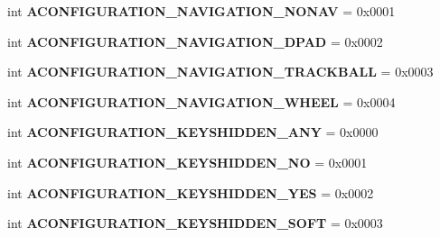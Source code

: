 \begin{DoxyCompactItemize}
\item 
\mbox{\label{classconfiguration_1_1AConfiguration_a73d9679d5df5e3169097d8616b2343c6}} 
int {\bfseries A\+C\+O\+N\+F\+I\+G\+U\+R\+A\+T\+I\+O\+N\+\_\+\+N\+A\+V\+I\+G\+A\+T\+I\+O\+N\+\_\+\+N\+O\+N\+AV} = 0x0001
\item 
\mbox{\label{classconfiguration_1_1AConfiguration_a982dee7deaf41fb4dc58f1a54fe3224e}} 
int {\bfseries A\+C\+O\+N\+F\+I\+G\+U\+R\+A\+T\+I\+O\+N\+\_\+\+N\+A\+V\+I\+G\+A\+T\+I\+O\+N\+\_\+\+D\+P\+AD} = 0x0002
\item 
\mbox{\label{classconfiguration_1_1AConfiguration_afce7273a0a26c3bebc7b920baa5c889e}} 
int {\bfseries A\+C\+O\+N\+F\+I\+G\+U\+R\+A\+T\+I\+O\+N\+\_\+\+N\+A\+V\+I\+G\+A\+T\+I\+O\+N\+\_\+\+T\+R\+A\+C\+K\+B\+A\+LL} = 0x0003
\item 
\mbox{\label{classconfiguration_1_1AConfiguration_accce645d66937e7851cf0ec89611b209}} 
int {\bfseries A\+C\+O\+N\+F\+I\+G\+U\+R\+A\+T\+I\+O\+N\+\_\+\+N\+A\+V\+I\+G\+A\+T\+I\+O\+N\+\_\+\+W\+H\+E\+EL} = 0x0004
\item 
\mbox{\label{classconfiguration_1_1AConfiguration_a4f7ef405b354dc2325f770854cccead4}} 
int {\bfseries A\+C\+O\+N\+F\+I\+G\+U\+R\+A\+T\+I\+O\+N\+\_\+\+K\+E\+Y\+S\+H\+I\+D\+D\+E\+N\+\_\+\+A\+NY} = 0x0000
\item 
\mbox{\label{classconfiguration_1_1AConfiguration_ae556a4e994f53ba58f8805315b8003a6}} 
int {\bfseries A\+C\+O\+N\+F\+I\+G\+U\+R\+A\+T\+I\+O\+N\+\_\+\+K\+E\+Y\+S\+H\+I\+D\+D\+E\+N\+\_\+\+NO} = 0x0001
\item 
\mbox{\label{classconfiguration_1_1AConfiguration_a96893c7317d158e5a51af7a432f0ea7f}} 
int {\bfseries A\+C\+O\+N\+F\+I\+G\+U\+R\+A\+T\+I\+O\+N\+\_\+\+K\+E\+Y\+S\+H\+I\+D\+D\+E\+N\+\_\+\+Y\+ES} = 0x0002
\item 
\mbox{\label{classconfiguration_1_1AConfiguration_a26a639ddd27a33c39500edf7ade5a01a}} 
int {\bfseries A\+C\+O\+N\+F\+I\+G\+U\+R\+A\+T\+I\+O\+N\+\_\+\+K\+E\+Y\+S\+H\+I\+D\+D\+E\+N\+\_\+\+S\+O\+FT} = 0x0003

\end{DoxyCompactItemize}
